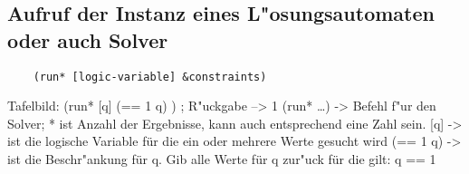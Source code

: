 \subsection{Aufruf der Instanz eines L"osungsautomaten oder auch Solver}

\begin{lstlisting}
    (run* [logic-variable] &constraints)
\end{lstlisting}


Tafelbild: (run* [q] (== 1 q) ) ; R"uckgabe --> 1
(run* \dots{}) -> Befehl f"ur den Solver; * ist Anzahl der Ergebnisse, kann auch entsprechend eine Zahl sein.
[q] -> ist die logische Variable für die ein oder mehrere Werte gesucht wird
(== 1 q) -> ist die Beschr"ankung für q.
\dq{}Gib alle Werte für q zur"uck für die gilt: q == 1\dq{}
